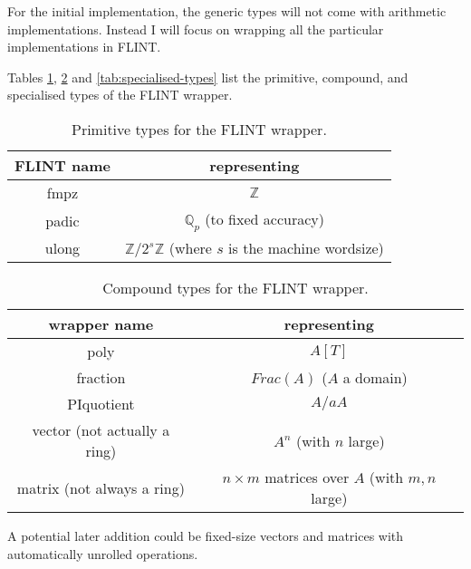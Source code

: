 \documentclass{scrartcl}
\begin{document}
For the initial implementation, the generic types will not come with
arithmetic implementations. Instead I will focus on wrapping all the
particular implementations in FLINT.

Tables \ref{tab:primitive-types}, \ref{tab:compound-types} and
\ref{tab:specialised-types} list the primitive, compound, and specialised
types of the FLINT wrapper.

\begin{table}[h]
\begin{center}
\begin{tabular}{cc}
FLINT name & representing \\
\hline
fmpz & $\mathbb{Z}$ \\
padic & $\mathbb{Q}_p$ (to fixed accuracy) \\
ulong & $\mathbb{Z}/2^{s}\mathbb{Z}$ (where $s$ is the machine wordsize) \\
\end{tabular}
\end{center}
\caption{Primitive types for the FLINT wrapper.}
\label{tab:primitive-types}
\end{table}

\begin{table}[h]
\begin{center}
\begin{tabular}{cc}
wrapper name & representing \\
\hline
poly & $A[T]$ \\
fraction & $Frac(A)$ ($A$ a domain) \\
PIquotient & $A/aA$ \\
vector (not actually a ring) & $A^n$ (with $n$ large) \\
matrix (not always a ring) & $n \times m$ matrices over $A$ (with $m, n$ large) \\
\end{tabular}
\end{center}
\caption{Compound types for the FLINT wrapper.}
\label{tab:compound-types}
\end{table}

A potential later addition could be fixed-size vectors and matrices with
automatically unrolled operations.
\end{document}
